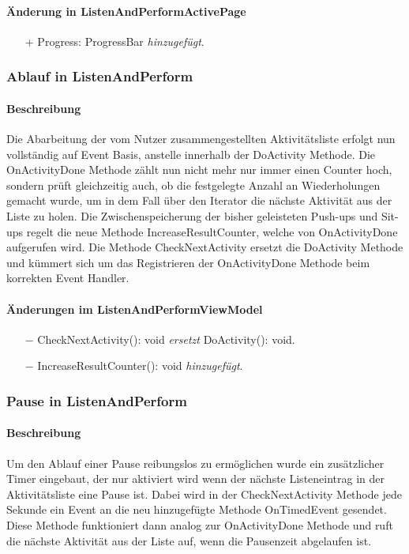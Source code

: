 \documentclass[a4paper,12pt]{article}
\begin{document}
\paragraph{Änderung in ListenAndPerformActivePage}
\begin{itemize}
	\item[+] Progress: ProgressBar \textit{hinzugefügt}.
\end{itemize}

\subsubsection{Ablauf in ListenAndPerform}
\paragraph{Beschreibung}
Die Abarbeitung der vom Nutzer zusammengestellten Aktivitätsliste erfolgt nun vollständig auf Event Basis, anstelle innerhalb der DoActivity Methode. Die OnActivityDone Methode zählt nun nicht mehr nur immer einen Counter hoch, sondern prüft gleichzeitig auch, ob die festgelegte Anzahl an Wiederholungen gemacht wurde, um in dem Fall über den Iterator die nächste Aktivität aus der Liste zu holen. Die Zwischenspeicherung der bisher geleisteten Push-ups und Sit-ups regelt die neue Methode IncreaseResultCounter, welche von OnActivityDone aufgerufen wird. Die Methode CheckNextActivity ersetzt die DoActivity Methode und kümmert sich um das Registrieren der OnActivityDone Methode beim korrekten Event Handler. 
\paragraph{Änderungen im ListenAndPerformViewModel}
\begin{itemize}
	\item[$-$] CheckNextActivity(): void \textit{ersetzt} DoActivity(): void.
	\item[$-$] IncreaseResultCounter(): void \textit{hinzugefügt}.
\end{itemize}
	
\subsubsection{Pause in ListenAndPerform}
\paragraph{Beschreibung}
Um den Ablauf einer Pause reibungslos zu ermöglichen wurde ein zusätzlicher Timer eingebaut, der nur aktiviert wird wenn der nächste Listeneintrag in der Aktivitätsliste eine Pause ist. Dabei wird in der CheckNextActivity Methode jede Sekunde ein Event an die neu hinzugefügte Methode OnTimedEvent gesendet. Diese Methode funktioniert dann analog zur OnActivityDone Methode und ruft die nächste Aktivität aus der Liste auf, wenn die Pausenzeit abgelaufen ist.
\end{document}

